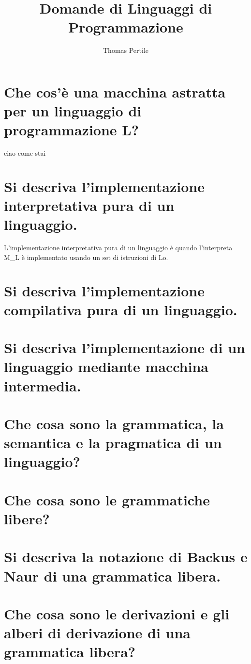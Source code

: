 \documentclass[a4paper, 10pt, italian]{article} %
\author{Thomas Pertile} %
\title{Domande di Linguaggi di Programmazione} %
\begin{document}
\maketitle %

\section{Che cos’\`{e} una macchina astratta per un linguaggio di programmazione L?} %
ciao 
come 
stai

\section{Si descriva l’implementazione interpretativa pura di un linguaggio.} %
L'implementazione interpretativa pura di un linguaggio \`{e} quando l'interpreta M_L \`{e} implementato usando un set di istruzioni di Lo.

\section{Si descriva l’implementazione compilativa pura di un linguaggio.}

\section{Si descriva l’implementazione di un linguaggio mediante macchina intermedia.}

\section{Che cosa sono la grammatica, la semantica e la pragmatica di un linguaggio?}

\section{Che cosa sono le grammatiche libere?}

\section{Si descriva la notazione di Backus e Naur di una grammatica libera.}

\section{Che cosa sono le derivazioni e gli alberi di derivazione di una grammatica libera?}
\end{document}
